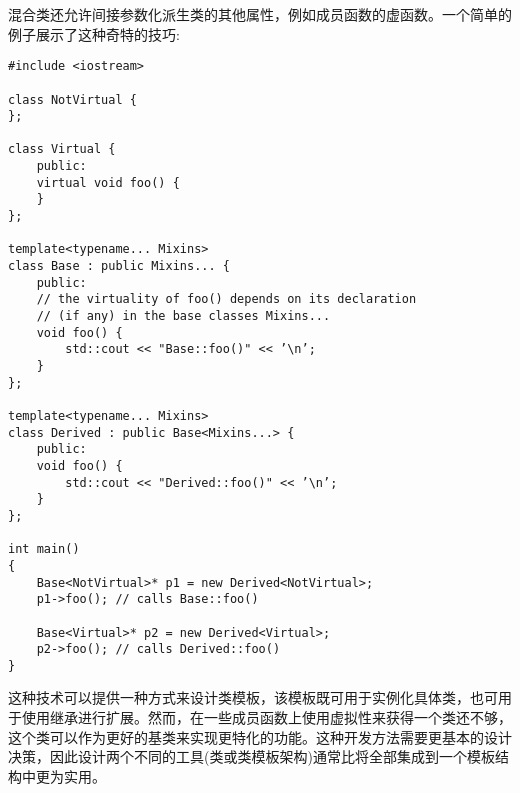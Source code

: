 混合类还允许间接参数化派生类的其他属性，例如成员函数的虚函数。一个简单的例子展示了这种奇特的技巧:

\begin{lstlisting}[style=styleCXX]
#include <iostream>

class NotVirtual {
};

class Virtual {
	public:
	virtual void foo() {
	}
};

template<typename... Mixins>
class Base : public Mixins... {
	public:
	// the virtuality of foo() depends on its declaration
	// (if any) in the base classes Mixins...
	void foo() {
		std::cout << "Base::foo()" << ’\n’;
	}
};

template<typename... Mixins>
class Derived : public Base<Mixins...> {
	public:
	void foo() {
		std::cout << "Derived::foo()" << ’\n’;
	}
};

int main()
{
	Base<NotVirtual>* p1 = new Derived<NotVirtual>;
	p1->foo(); // calls Base::foo()
	
	Base<Virtual>* p2 = new Derived<Virtual>;
	p2->foo(); // calls Derived::foo()
}
\end{lstlisting}

这种技术可以提供一种方式来设计类模板，该模板既可用于实例化具体类，也可用于使用继承进行扩展。然而，在一些成员函数上使用虚拟性来获得一个类还不够，这个类可以作为更好的基类来实现更特化的功能。这种开发方法需要更基本的设计决策，因此设计两个不同的工具(类或类模板架构)通常比将全部集成到一个模板结构中更为实用。






